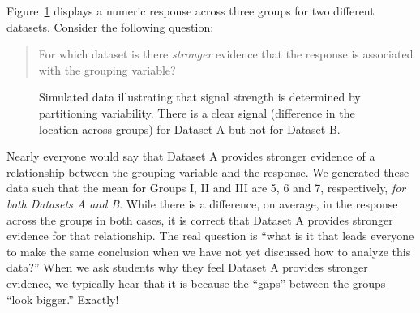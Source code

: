 \documentclass[
  letterpaper,
  DIV=11,
  numbers=noendperiod]{scrreprt}
\theoremstyle{plain}
\theoremstyle{definition}
\theoremstyle{definition}
\theoremstyle{remark}
\begin{document}
Figure~\ref{fig-anovateststat-boxplots} displays a numeric response
across three groups for two different datasets. Consider the following
question:

\begin{quote}
For which dataset is there \emph{stronger} evidence that the response is
associated with the grouping variable?
\end{quote}

\begin{figure}


\caption{\label{fig-anovateststat-boxplots}Simulated data illustrating
that signal strength is determined by partitioning variability. There is
a clear signal (difference in the location across groups) for Dataset A
but not for Dataset B.}

\end{figure}%

Nearly everyone would say that Dataset A provides stronger evidence of a
relationship between the grouping variable and the response. We
generated these data such that the mean for Groups I, II and III are 5,
6 and 7, respectively, \emph{for both Datasets A and B}. While there is
a difference, on average, in the response across the groups in both
cases, it is correct that Dataset A provides stronger evidence for that
relationship. The real question is ``what is it that leads everyone to
make the same conclusion when we have not yet discussed how to analyze
this data?'' When we ask students why they feel Dataset A provides
stronger evidence, we typically hear that it is because the ``gaps''
between the groups ``look bigger.'' Exactly!
\end{document}
